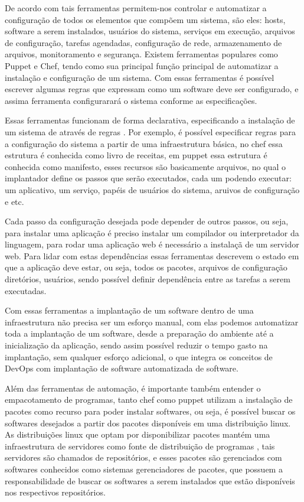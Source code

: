 De acordo com \cite{6265084} tais ferramentas permitem-nos controlar e automatizar
a configuração de todos os elementos que compõem um sistema, são eles: hosts, software a serem instalados,
usuários do sistema, serviços em execução, arquivos de configuração, tarefas agendadas,
configuração de rede, armazenamento de arquivos, monitoramento e segurança. Existem
ferramentas populares como Puppet e Chef, tendo como sua principal função principal
de automatizar a instalação e configuração de um sistema. Com essas ferramentas é
possível escrever algumas regras que expressam como um software deve ser configurado,
e assima ferramenta configurarará o sistema conforme as especificações.

Essas ferramentas funcionam de forma declarativa, especificando a instalação de um sistema de
através de regras \cite{6265084}. Por exemplo, é possível especificar regras para a configuração do sistema
a partir de uma infraestrutura básica, no chef essa estrutura é conhecida como livro
de receitas, em puppet essa estrutura é conhecida como manifesto, esses recursos
são basicamente arquivos, no qual o implantador define os passos que serão executados,
cada um podendo executar: um aplicativo, um serviço, papéis de usuários do sistema,
aruivos de configuração e etc.

Cada passo da configuração desejada pode depender de outros passos, ou seja, para
instalar uma aplicação é preciso instalar um compilador ou interpretador da linguagem,
para rodar uma aplicação web é necessário a instalaçã de um servidor web. Para
lidar com estas dependências essas ferramentas descrevem o estado em que a aplicação
deve estar, ou seja, todos os pacotes, arquivos de configuração diretórios, usuários,
sendo possível definir dependência entre as tarefas a serem executadas.

Com essas ferramentas a implantação de um software dentro de uma infraestrutura
não precisa ser um esforço manual, com elas podemos automatizar toda a implantação
de um software, desde a preparação do ambiente até a inicialização da aplicação,
sendo assim possível reduzir o tempo gasto na implantação, sem qualquer esforço
adicional, o que integra os conceitos de DevOps com implantação de software automatizada
de software.

Além das ferramentas de automação, é importante também entender o empacotamento de
programas, tanto chef como puppet utilizam a instalação de pacotes como recurso para
poder instalar softwares, ou seja, é possível buscar os softwares desejados a partir
dos pacotes disponíveis em uma distribuição linux. As distribuições linux que
optam por disponibilizar pacotes mantém uma infraestrutura de servidores como fonte
de distribuição de programas \cite{araujo2011apprecommender}, tais servidores são
chamados de repositórios, e esses pacotes são gerenciados com softwares conhecidos
como sistemas gerenciadores de pacotes, que possuem a responsabilidade de buscar
os softwares a serem instalados que estão disponíveis nos respectivos repositórios.

